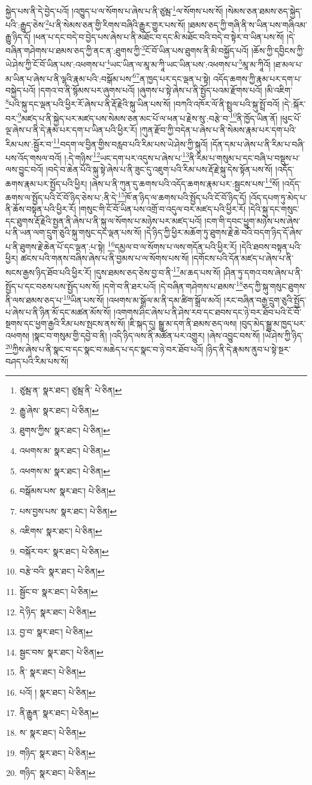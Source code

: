 སྐྱེད་པས་ནི་དེ་བྱེད་པའོ། །འཁྱུད་པ་ལ་སོགས་པ་ཞེས་པ་ནི་ཙུམྦ་\footnote{ཙུམྦ་ན་  སྣར་ཐང་། ཙུམྦ་ནི་  པེ་ཅིན། }ལ་སོགས་པས་སོ། །སེམས་ཅན་ཐམས་ཅད་སྐྱེད་པའི་:རྒྱུད་ཅེས་\footnote{རྒྱུ་ཞེས་  སྣར་ཐང་།  པེ་ཅིན། }པ་ནི་སེམས་ཅན་གྱི་རིགས་བཞིའི་རྒྱུར་གྱུར་པས་སོ། །ཐམས་ཅད་ཀྱི་གཞི་ནི་ས་ཡིན་པས་གཞིའམ་རྒྱུ་ཉིད་དོ། །ཕན་པ་དང་བདེ་བ་བྱེད་པས་ཞེས་པ་ནི་མཐོང་བ་དང་མི་མཐོང་བའི་བདེ་བ་སྟེར་བ་ཡིན་པས་སོ། །དེ་བཞིན་གཤེགས་པ་ཐམས་ཅད་ཀྱི་ནང་ན་:ཐུགས་ཀྱི་\footnote{ཐུགས་ཀྱིས་  སྣར་ཐང་།  པེ་ཅིན། }ངོ་བོ་ཡིན་པས་ཐུགས་ནི་མི་བསྐྱོད་པའོ། །ཆོས་ཀྱི་དབྱིངས་ཀྱི་ཡེ་ཤེས་ཀྱི་ངོ་བོ་ཡིན་པས་:འཕགས་པ་\footnote{འཕགས་མ་  སྣར་ཐང་།  པེ་ཅིན། }ཡང་ཡིན་ལ་མཱ་མ་ཀཱི་ཡང་ཡིན་པས་:འཕགས་པ་\footnote{འཕགས་མ་  སྣར་ཐང་།  པེ་ཅིན། }མཱ་མ་ཀཱིའོ། །ཐ་མལ་པ་མ་ཡིན་པ་ཞེས་པ་ནི་ལྷའི་རྣམ་པའི་:བསྒོམ་པས་\footnote{བསྒོམས་པས་  སྣར་ཐང་།  པེ་ཅིན། }\footnote{པས་བྱས་པས་  སྣར་ཐང་།  པེ་ཅིན། }ན་ཁྱད་པར་དང་ལྡན་པ་སྟེ། འདོད་ཆགས་ཀྱི་རྣམ་པར་དག་པ་བསྐྱེད་པའོ། །དགའ་བ་ནི་སྙོམས་པར་ཞུགས་པའོ། །ཞུགས་པ་སྟེ་ཞེས་པ་ནི་སྤྱོད་པའམ་རྫོགས་པའོ། །མི་འཇིག་\footnote{འཇིགས་  སྣར་ཐང་།  པེ་ཅིན། }པའི་སྐུ་དང་ལྡན་པའི་ཕྱིར་རོ་ཞེས་པ་ནི་རྡོ་རྗེའི་སྐུ་ཡིན་པས་སོ། །བཀའི་འཁོར་ལོ་ནི་སྤྲུལ་པའི་སྐུ་སྤྲོ་བའོ། །དེ་:སྐོར་བར་\footnote{བསྐོར་བར་  སྣར་ཐང་།  པེ་ཅིན། }མཛད་པ་ནི་སྐྱེད་པར་མཛད་པས་སེམས་ཅན་མང་པོ་ལ་ཕན་པ་རྗེས་སུ་:བརྩེ་བ་\footnote{བརྩེ་བའི་  སྣར་ཐང་།  པེ་ཅིན། }ནི་ཁྱོད་ཡིན་ནོ། །ཕུང་པོ་ལྔ་ཞེས་པ་ནི་དེ་རྣམ་པར་དག་པ་ཡིན་པའི་ཕྱིར་རོ། །ཀུན་རྫོབ་ཀྱི་བདེན་པ་ཞེས་པ་ནི་སེམས་རྣམ་པར་དག་པའི་རིམ་པས་:སྦྱོར་བ་\footnote{སྦྱོང་བ་  སྣར་ཐང་།  པེ་ཅིན། }བདག་ལ་བྱིན་གྱིས་བརླབ་པའི་རིམ་པས་ཡེ་ཤེས་ཀྱི་སྐུའོ། །དོན་དམ་པ་ཞེས་པ་ནི་རིམ་པ་བཞི་པས་འོད་གསལ་བའོ། །:དེ་གཉིས་\footnote{དེ་ཉིད་  སྣར་ཐང་།  པེ་ཅིན། }ཡང་དག་པར་འདུས་པ་ཞེས་པ་\footnote{བྱ་བ་  སྣར་ཐང་།  པེ་ཅིན། }ནི་རིམ་པ་གསུམ་པ་དང་བཞི་པ་བསྡུས་པ་ལས་བྱུང་བའོ། །བདེ་བ་ཆེན་པོའི་སྐུ་སྟེ་ཞེས་པ་ནི་ཟུང་དུ་འཇུག་པའི་རིམ་པས་རྡོ་རྗེ་སྐུ་དེས་སྟོན་པས་སོ། །འདོད་ཆགས་རྣམ་པར་སྤྱོད་པའི་ཕྱིར། །ཞེས་པ་ནི་ཀུན་དུ་ཆགས་པའི་འདོད་ཆགས་རྣམ་པར་:སྦྱངས་པས་\footnote{སྦྱང་བས་  སྣར་ཐང་།  པེ་ཅིན། }སོ། །འདོད་ཆགས་ལ་སྤྱོད་པའི་ངོ་བོ་ཉིད་ཅེས་པ་:ནི་དེ་\footnote{ནི་  སྣར་ཐང་།  པེ་ཅིན། }ཁོ་ན་ཉིད་ལ་ཆགས་པའི་སྤྱོད་པའི་ངོ་བོ་ཉིད་དོ། །འོད་དཔག་ཏུ་མེད་པ་ནི་ཆོས་བསྟན་པའི་ཕྱིར་རོ། །གསུང་གི་ངོ་བོ་ཡིན་པས་འགྲོ་བ་འདུལ་བར་མཛད་པའི་ཕྱིར་རོ། །དེའི་སྐུ་དང་གསུང་དང་ཐུགས་རྡོ་རྗེའི་སྤྱན་ནི་ཞེས་པ་ནི་སྐུ་ལ་སོགས་པ་མཉེས་པར་མཛད་པའོ། །ངག་གི་དབང་ཕྱུག་མཉེས་པས་ཞེས་པ་ནི་ཡན་ལག་དྲུག་ཅུའི་སྐུ་གསུང་དང་ལྡན་པས་སོ། །དེ་ཉིད་ཀྱི་ཕྱིར་མཆོག་ཏུ་ཐུགས་རྗེ་ཆེ་བའི་བདག་ཉིད་དོ་ཞེས་པ་ནི་ཐུགས་རྗེ་ཆེན་པོ་དང་ལྡན་:པ་སྟེ། \footnote{པའོ། །   སྣར་ཐང་།  པེ་ཅིན། }དམྱལ་བ་ལ་སོགས་པ་ལས་གདོན་པའི་ཕྱིར་རོ། །དེའི་ཐབས་བསྟན་པའི་ཕྱིར། ཚངས་པའི་གནས་བཞིས་ཞེས་པ་ནི་བྱམས་པ་ལ་སོགས་པས་སོ། །དགོངས་པའི་དོན་མཛད་པ་ཞེས་པ་ནི་སངས་རྒྱས་ཉིད་ཐོབ་པའི་ཕྱིར་རོ། །དུས་ཐམས་ཅད་ཅེས་བྱ་བ་ནི་\footnote{ནི་རྒྱུན་  སྣར་ཐང་།  པེ་ཅིན། }མ་ཆད་པས་སོ། །ཤིན་ཏུ་དགའ་བས་ཞེས་པ་ནི་སྤྱོད་པ་དང་བཅས་པས་སྤྱོད་པས་སོ། །དགེ་བ་ནི་ཐར་པའོ། །དེ་བཞིན་གཤེགས་པ་ཐམས་\footnote{ས་  སྣར་ཐང་།  པེ་ཅིན། }ཅད་ཀྱི་སྐུ་གསུང་ཐུགས་ནི་ལས་ཐམས་ཅད་པ་\footnote{གཉིད་  སྣར་ཐང་།  པེ་ཅིན། }ཡིན་པས་སོ། །འཕགས་མ་སྒྲོལ་མ་ནི་དམ་ཚིག་སྒྲོལ་མའོ། །རང་བཞིན་བརྒྱ་དྲུག་ཅུའི་སྤྱོད་པ་ཞེས་པ་ནི་ཉིན་མོ་དང་མཚན་མོས་སོ། །འགགས་ཤིང་ཞེས་པ་ནི་ཤེས་རབ་དང་ཐབས་དང་ཉེ་བར་ཐོབ་པའི་ངོ་བོ་སྔགས་དང་ཕྱག་རྒྱའི་རིམ་པས་སྤངས་ནས་སོ། །ཇི་སྐད་དུ། སྒྱུ་མ་དག་ནི་ཐམས་ཅད་ལས། །བུད་མེད་སྒྱུ་མ་ཁྱད་པར་འཕགས། །སྣང་བ་གསུམ་གྱི་དབྱེ་བ་ནི། །འདི་ཉིད་ལས་ནི་མཚོན་པར་འགྱུར། །ཞེས་འབྱུང་བས་སོ། །ཡེ་ཤེས་ཀྱི་ཉིད་\footnote{གཉིད་  སྣར་ཐང་།  པེ་ཅིན། }ཀྱིས་ཞེས་པ་ནི་སྣང་བ་དང་སྣང་བ་མཆེད་པ་དང་སྣང་བ་ཉེ་བར་ཐོབ་པའོ། །ཉིད་ནི་དེ་རྣམས་ནུབ་པ་སྟེ་སྔར་བཤད་པའི་རིམ་པས་སོ། 